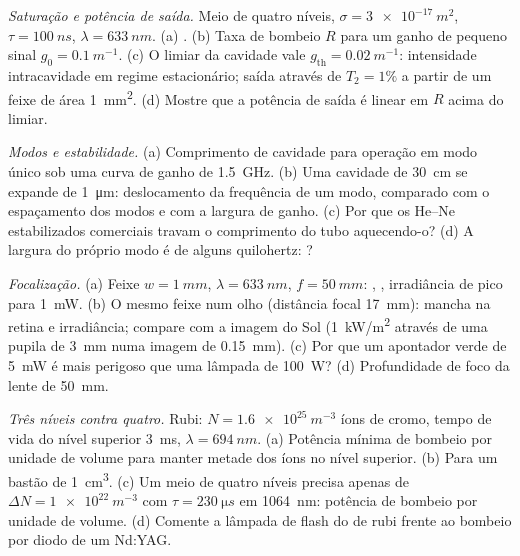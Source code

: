 \begin{exercise}[$\star\star$]\label{exo:b2:laser:6}
\emph{Saturação e potência de saída.} Meio de quatro níveis, $\sigma =
\qty{3e-17}{m^2}$, $\tau = \qty{100}{ns}$, $\lambda = \qty{633}{nm}$.
(a) . (b) Taxa de bombeio $R$ para um ganho de pequeno sinal
$g_0 = \qty{0.1}{m^{-1}}$. (c) O limiar da cavidade vale
$g_{\text{th}} = \qty{0.02}{m^{-1}}$: intensidade intracavidade em regime
estacionário; saída através de $T_2 = 1\%$ a partir de um feixe de área \qty{1}{mm^2}.
(d) Mostre que a potência de saída é linear em $R$ acima do limiar.
\end{exercise}

\begin{exercise}[$\star\star$]\label{exo:b2:laser:7}
\emph{Modos e estabilidade.} (a) Comprimento de cavidade para operação em modo único
sob uma curva de ganho de \qty{1.5}{GHz}. (b) Uma cavidade de \qty{30}{cm} se expande
de \qty{1}{\micro m}: deslocamento da frequência de um modo, comparado com o
espaçamento dos modos e com a largura de ganho. (c) Por que os He--Ne estabilizados
comerciais travam o comprimento do tubo aquecendo-o? (d) A largura do próprio modo é de
alguns quilohertz: ?
\end{exercise}

\begin{exercise}[$\star\star$]\label{exo:b2:laser:8}
\emph{Focalização.} (a) Feixe $w = \qty{1}{mm}$, $\lambda = \qty{633}{nm}$,
$f = \qty{50}{mm}$: , , irradiância de pico para
\qty{1}{mW}. (b) O mesmo feixe num olho (distância focal \qty{17}{mm}):
mancha na retina e irradiância; compare com a imagem do Sol
(\qty{1}{kW/m^2} através de uma pupila de \qty{3}{mm} numa imagem de \qty{0.15}{mm}).
(c) Por que um apontador verde de \qty{5}{mW} é mais perigoso que uma
lâmpada de \qty{100}{W}? (d) Profundidade de foco da lente de \qty{50}{mm}.
\end{exercise}

\begin{exercise}[$\star\star$]\label{exo:b2:laser:9}
\emph{Três níveis contra quatro.} Rubi: $N = \qty{1.6e25}{m^{-3}}$
íons de cromo, tempo de vida do nível superior \qty{3}{ms}, $\lambda =
\qty{694}{nm}$. (a) Potência mínima de bombeio por unidade de volume para manter metade
dos íons no nível superior. (b) Para um bastão de \qty{1}{cm^3}. (c) Um meio de quatro
níveis precisa apenas de $\Delta N = \qty{1e22}{m^{-3}}$ com $\tau =
\qty{230}{\micro s}$ em \qty{1064}{nm}: potência de bombeio por unidade de volume. (d) Comente
a lâmpada de flash do  de rubi frente ao bombeio por diodo de um Nd:YAG.
\end{exercise}

